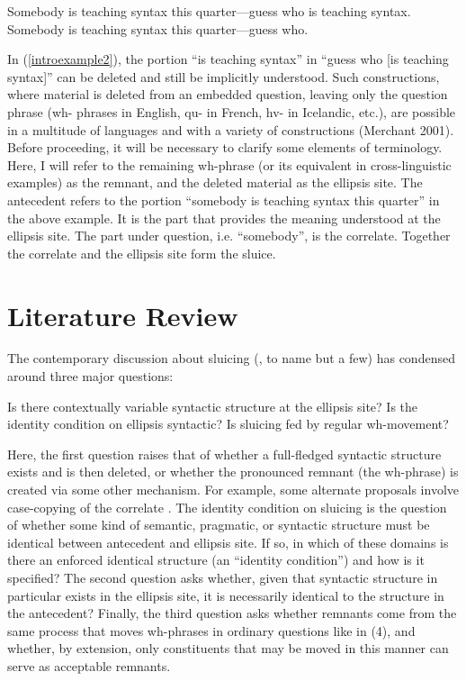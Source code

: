\documentclass{turabian-researchpaper}
\begin{document}
\begin{exe}
\ex\label{introexample1} Somebody is teaching syntax this quarter---guess who is teaching syntax. 
\ex\label{introexample2} Somebody is teaching syntax this quarter---guess who. 
\end{exe} 

In (\ref{introexample2}), the portion ``is teaching syntax'' in ``guess who [is teaching syntax]'' can be deleted and still be implicitly understood. Such constructions, where material is deleted from an embedded question, leaving only the question phrase (wh- phrases in English, qu- in French, hv- in Icelandic, etc.), are possible in a multitude of languages and with a variety of constructions (Merchant 2001).  Before proceeding, it will be necessary to clarify some elements of terminology. Here, I will refer to the remaining wh-phrase (or its equivalent in cross-linguistic examples) as the remnant, and the deleted material as the ellipsis site. The antecedent refers to the portion ``somebody is teaching syntax this quarter'' in the above example. It is the part that provides the meaning understood at the ellipsis site. The part under question, i.e. ``somebody'', is the correlate. Together the correlate and the ellipsis site form the sluice. 

\section{Literature Review}
The contemporary discussion about sluicing (\citep*{merchant, clm, barros14}, to name but a few) has condensed around three major questions: 
\begin{exe}
\ex\label{bigquestions} 
\begin{xlist}
\ex Is there contextually variable syntactic structure at the ellipsis site? 
\ex Is the identity condition on ellipsis syntactic? 
\ex Is sluicing fed by regular wh-movement? 
\end{xlist}
\end{exe}

\noindent Here, the first question raises that of whether a full-fledged syntactic structure exists and is then deleted, or whether the pronounced remnant (the wh-phrase) is created via some other mechanism. For example, some alternate proposals involve case-copying of the correlate \citep{manetta2013, chomsky1995principles}.  
The identity condition on sluicing is the question of whether some kind of semantic, pragmatic, or syntactic structure must be identical between antecedent and ellipsis site. If so, in which of these domains is there an enforced identical structure (an ``identity condition'') and how is it specified?  The second question asks whether, given that syntactic structure in particular exists in the ellipsis site, it is necessarily identical to the structure in the antecedent? Finally, the third question asks whether remnants come from the same process that moves wh-phrases in ordinary questions like in (4), and whether, by extension, only constituents that may be moved in this manner can serve as acceptable remnants.  
\end{document}
